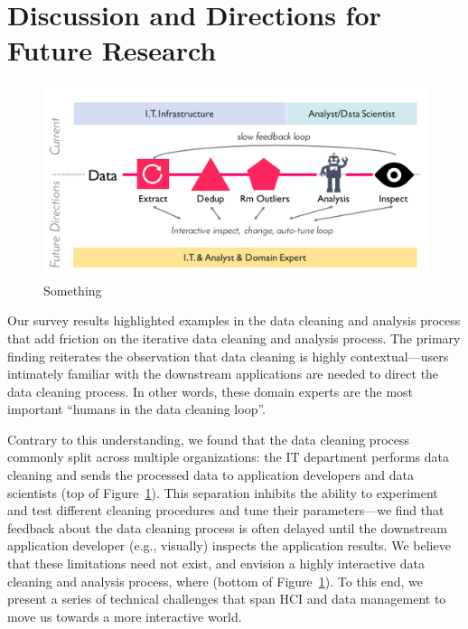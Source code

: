 \section{Discussion and Directions for Future Research}\label{sec:future}


\begin{figure}
  \centering
  \includegraphics[width=.9\columnwidth]{datafigs/arch}
  \caption{Something}
  \label{f:arch}
\end{figure}

Our survey results highlighted examples in the data cleaning and analysis process that add friction on the iterative data cleaning and analysis process.  The primary finding reiterates the observation that data cleaning is highly contextual---users intimately familiar with the downstream applications are needed to direct the data cleaning process.  In other words, these domain experts are the most important ``humans in the data cleaning loop''.  

Contrary to this understanding, we found that the data cleaning process commonly split across multiple organizations: the IT department performs data cleaning and sends the processed data to application developers and data scientists (top of Figure~\ref{f:arch}).  This separation inhibits the ability to experiment and test different cleaning procedures and tune their parameters---we find that feedback about the data cleaning process is often delayed until the downstream application developer (e.g., visually) inspects the application results.  We believe that these limitations need not exist, and envision a highly interactive data cleaning and analysis process, where {\color{red}{something sexy}} (bottom of Figure~\ref{f:arch}). To this end, we present a series of technical challenges that span HCI and data management to move us towards a more interactive world.



